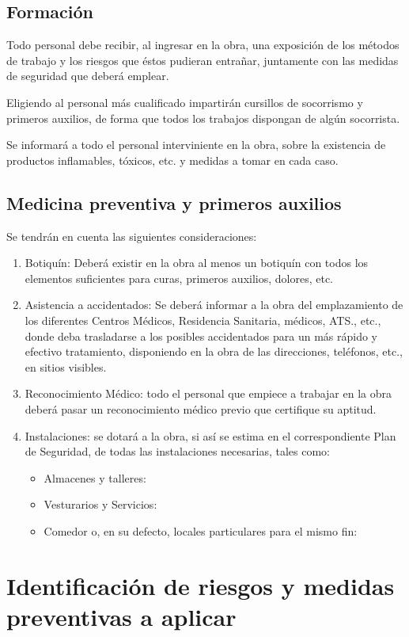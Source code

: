 \subsection{Formación}
\label{subsec:sys-prlFormacion}
Todo personal debe recibir, al ingresar en la obra, una exposición de los métodos de trabajo y los riesgos que éstos pudieran entrañar, juntamente con las medidas de seguridad que deberá emplear.

Eligiendo al personal más cualificado impartirán cursillos de socorrismo y primeros auxilios, de forma que todos los trabajos dispongan de algún socorrista.

Se informará a todo el personal interviniente en la obra, sobre la existencia de productos inflamables, tóxicos, etc. y medidas a tomar en cada caso.
\subsection{Medicina preventiva y primeros auxilios}
\label{subsec:sys-prlMedicina}
Se tendrán en cuenta las siguientes consideraciones:
\begin{enumerate}
    \item Botiquín: Deberá existir en la obra al menos un botiquín con todos los elementos suficientes para curas, primeros auxilios, dolores, etc.
    \item Asistencia a accidentados: Se deberá informar a la obra del emplazamiento de los diferentes Centros Médicos, Residencia Sanitaria, médicos, ATS., etc., donde deba trasladarse a los posibles accidentados para un más rápido y efectivo tratamiento, disponiendo en la obra de las direcciones, teléfonos, etc., en sitios visibles.
    \item Reconocimiento Médico: todo el personal que empiece a trabajar en la obra deberá pasar un reconocimiento médico previo que certifique su aptitud.
    \item Instalaciones: se dotará a la obra, si así se estima en el correspondiente Plan de Seguridad, de todas las instalaciones necesarias, tales como:
    \begin{itemize}[label=--]
        \item Almacenes y talleres:
        \item Vesturarios y Servicios:
        \item Comedor o, en su defecto, locales particulares para el mismo fin:
    \end{itemize}
\end{enumerate}
\section{Identificación de riesgos y medidas preventivas a aplicar}
\label{sec:sys-riesgos}

